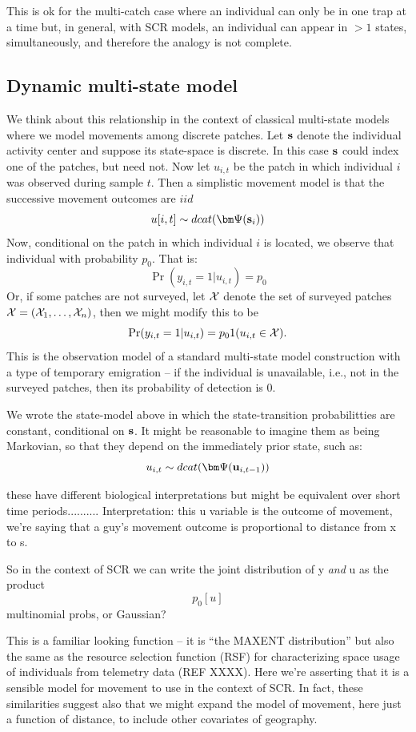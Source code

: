 This is ok for the multi-catch case where an individual can only be in
one trap at a time but, in general, with SCR models, an individual can
appear in $>1$ states, simultaneously, and therefore the analogy is
not complete.

\subsection{Dynamic multi-state model}

We think about this relationship in the context of classical
multi-state models where we model movements among discrete patches.
Let ${\bf s}$ denote the individual activity
center and suppose its state-space is discrete. In this case ${\bf s}$
could index one of the patches, but need not.
Now let $u_{i,t}$ be
the patch in which individual $i$ was observed during sample $t$. Then
a simplistic movement model is that the successive movement outcomes
are $iid$
\[
u[i,t] \sim  dcat( {\bm \Psi}({\bf s}_{i}) )
\]
Now, conditional on the patch in which individual $i$ is located, we
observe that individual with probability $p_{0}$. That is:
\[
 \Pr(y_{i,t} = 1| u_{i,t} )  = p_{0}
\]
Or, if some patches are not surveyed, let ${\cal X}$ denote the set of
surveyed patches ${\cal X} = ({\cal X}_{1},\ldots,{\cal X}_{n})$, 
then we might modify this to be
\[
 \Pr(y_{i,t} = 1| u_{i,t} )  = p_{0}1(u_{i,t} \in {\cal X}).
\]
This is the observation model of a standard multi-state model construction with a type of
temporary emigration -- if the individual is unavailable, i.e., not in
the surveyed patches, then its probability of detection is 0. 

We wrote the state-model above in which the state-transition
probabilitties are constant, conditional on ${\bf s}$. 
It might be reasonable to imagine them as being Markovian, so that
they depend on the immediately prior state, such as:
\[
u_{i,t} \sim  dcat( {\bm \Psi}({\bf u}_{i,t-1}) )
\]

these have different biological interpretations but might be
equivalent over short time periods..........
Interpretation: this u variable is the outcome of movement,
we're saying that a guy's movement outcome is proportional to distance
from x to s. 

So in the context of SCR we can write the joint distribution of y {\it
  and} u as the product
\[
p_{0} [u]
\]
multinomial probs, or Gaussian?

This is a familiar looking function -- it is ``the MAXENT
distribution'' but also the same as the resource selection function (RSF)
for characterizing space usage of individuals from telemetry data (REF XXXX).
Here we're asserting that it is a sensible model for movement to use in 
the context of SCR. In fact, these similarities suggest also that we might
expand the model of movement, here just a function of distance, to include
other covariates of geography.


